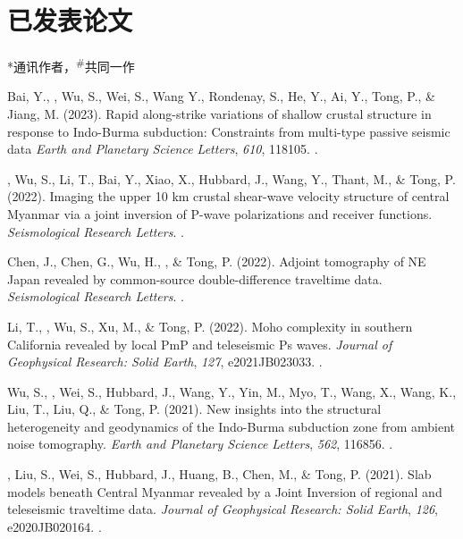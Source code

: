 \section{已发表论文}
\newcommand{\CS}{*} %
\newcommand{\CF}{\textsuperscript{\#}} %

\CS 通讯作者，\CF 共同一作
\begin{etaremune}
\item
    Bai, Y., \Yao, Wu, S., Wei, S., Wang Y., Rondenay, S., He, Y., Ai, Y., Tong, P., \& Jiang, M. (2023).
    Rapid along-strike variations of shallow crustal structure in response to Indo-Burma subduction: Constraints from multi-type passive seismic data
    \textit{Earth and Planetary Science Letters}, \textit{610}, 118105.
    .
\item
    \Yao, Wu, S., Li, T., Bai, Y., Xiao, X., Hubbard, J., Wang, Y., Thant, M., \& Tong, P. (2022).
    Imaging the upper 10 km crustal shear-wave velocity structure of central Myanmar via a joint inversion of P-wave polarizations and receiver functions.
    \textit{Seismological Research Letters}.
	.
\item
    Chen, J., Chen, G., Wu, H., \Yao, \& Tong, P. (2022).
    Adjoint tomography of NE Japan revealed by common-source double-difference traveltime data.
    \textit{Seismological Research Letters}.
    .
\item
    Li, T., \Yao, Wu, S., Xu, M., \& Tong, P. (2022).
    Moho complexity in southern California revealed by local PmP and teleseismic Ps waves.
    \textit{Journal of Geophysical Research: Solid Earth}, \textit{127}, e2021JB023033.
    .
\item
    Wu, S., \Yao, Wei, S., Hubbard, J., Wang, Y., Yin, M., Myo, T., Wang, X., Wang, K., Liu, T., Liu, Q., \& Tong, P. (2021).
    New insights into the structural heterogeneity and geodynamics of the Indo-Burma subduction zone from ambient noise tomography.
    \textit{Earth and Planetary Science Letters}, \textit{562}, 116856.
    .
\item
    \Yao, Liu, S., Wei, S., Hubbard, J., Huang, B., Chen, M., \& Tong, P. (2021).
    Slab models beneath Central Myanmar revealed by a Joint Inversion of regional and teleseismic traveltime data.
    \textit{Journal of Geophysical Research: Solid Earth}, \textit{126}, e2020JB020164.
    .
\item

\end{etaremune}
